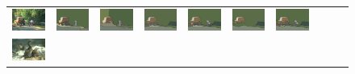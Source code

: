 \begin{figure}[tb]
\begin{center}
\begin{tabular}{cccccccccc}
\\
\hspace{-2mm}
\includegraphics[width=2cm]{scale-aware/fig/visual_result/visual_result_2_1.png} \hspace{-4mm}
&\includegraphics[width=2cm]{scale-aware/fig/visual_result/visual_result_2_2.png} \hspace{-4mm}
&\includegraphics[width=2cm]{scale-aware/fig/visual_result/visual_result_2_3.png} \hspace{-4mm}
&\includegraphics[width=2cm]{scale-aware/fig/visual_result/visual_result_2_4.png}\hspace{-4mm}
&\includegraphics[width=2cm]{scale-aware/fig/visual_result/visual_result_2_5.png} \hspace{-4mm}
&\includegraphics[width=2cm]{scale-aware/fig/visual_result/visual_result_2_6.png} \hspace{-4mm}
&\includegraphics[width=2cm]{scale-aware/fig/visual_result/visual_result_2_7.png} \hspace{-4mm}
\\
\hspace{-2mm}
\includegraphics[width=2cm]{scale-aware/fig/visual_result/visual_result_3_1.png} \hspace{-4mm}

\end{tabular}
\end{center}
\end{figure}
